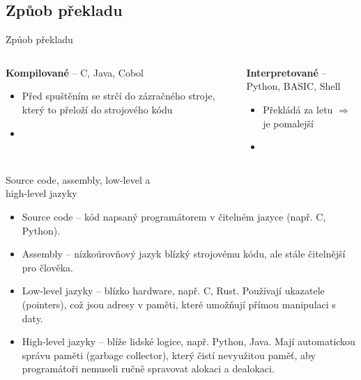 \documentclass[aspectratio=169,xcolor=dvipsnames, t]{beamer}
\begin{document}
{\subsection{Způob překladu}
\begin{frame}{Způob překladu}
    \begin{columns}
        \begin{column}{0.5\textwidth}
            \textbf{Kompilované} -- C, Java, Cobol
            \begin{itemize}
                \item Před spuštěním se strčí do zázračného stroje, který to přeloží do strojového kódu
                \item 
            \end{itemize}
        \end{column}
        \begin{column}{0.5\textwidth}
            \textbf{Interpretované} -- Python, BASIC, Shell
            \begin{itemize}
                \item Překládá za letu $\Rightarrow$ je pomalejší
                \item 
            \end{itemize}
        \end{column}
    \end{columns}
\end{frame}

\begin{frame}{Source code, assembly, low-level a \\ high-level jazyky}
    \begin{itemize}
        \item Source code – kód napsaný programátorem v čitelném jazyce (např. C, Python).
\item Assembly – nízkoúrovňový jazyk blízký strojovému kódu, ale stále čitelnější pro člověka.
\item Low-level jazyky – blízko hardware, např. C, Rust. Používají ukazatele (pointers), což jsou adresy v paměti, které umožňují přímou manipulaci s daty.
\item High-level jazyky – blíže lidské logice, např. Python, Java. Mají automatickou správu paměti (garbage collector), který čistí nevyužitou paměť, aby programátoři nemuseli ručně spravovat alokaci a dealokaci.
\end{itemize}
\end{frame}




}
\end{document}
